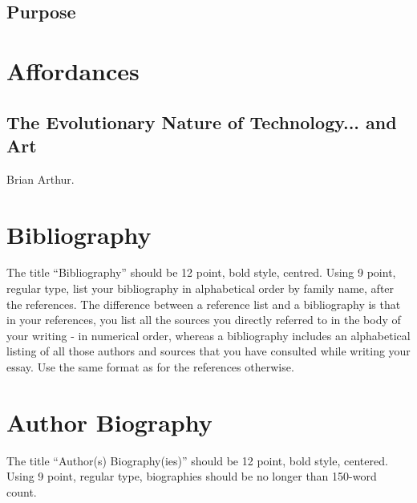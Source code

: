 \documentclass[letterpaper]{article}
\begin{document}
    \subsection{Purpose}

\section{Affordances}

    \subsection{The Evolutionary Nature of Technology... and Art}

        Brian Arthur.
    





\section{Bibliography}
The title “Bibliography” should be 12 point, bold style, centred. Using 9 point, regular type, list your bibliography in alphabetical order by family name, after the references. The difference between a reference list and a bibliography is that in your references, you list all the sources you directly referred to in the body of your writing - in numerical order, whereas a bibliography includes an alphabetical listing of all those authors and sources that you have consulted while writing your essay. Use the same format as for the references otherwise.

\section{Author Biography}

The title ``Author(s) Biography(ies)'' should be 12 point, bold style, centered. Using 9 point, regular type, biographies should be no longer than 150-word count.
\end{document}
